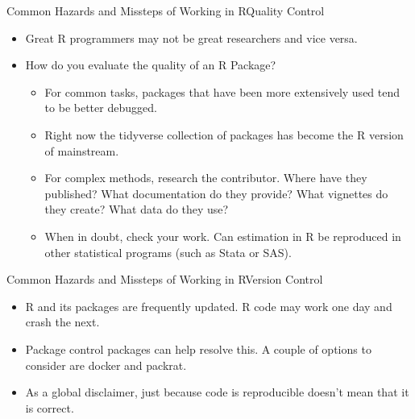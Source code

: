 \documentclass{beamer}
\begin{document}
\begin{frame}{Common Hazards and Missteps of Working in R}{Quality Control}
\begin{itemize}
    \item Great R programmers may not be great researchers and vice versa.
    \item How do you evaluate the quality of an R Package?
    \begin{itemize}
        \item For common tasks, packages that have been more extensively used tend to be better debugged.  
        \item Right now the tidyverse collection of packages has  become the R version of mainstream.
        \item For complex methods, research the contributor.  Where have they published?  What documentation do they provide?  What vignettes do they create?  What data do they use?
        \item When in doubt, check your work.  Can estimation in R be reproduced in other statistical programs (such as Stata or SAS).  
    \end{itemize}
\end{itemize}
\end{frame}

\begin{frame}{Common Hazards and Missteps of Working in R}{Version Control}
\begin{itemize}
    \item R and its packages are frequently updated.  R code may work one day and crash the next.
    \item Package control packages can help resolve this.  A couple of options to consider are docker and packrat.
    \item As a global disclaimer, just because code is reproducible doesn't mean that it is correct.  
    
\end{itemize}
\end{frame}
\end{document}
